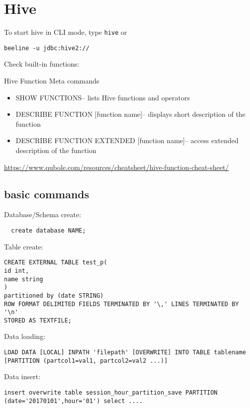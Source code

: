 \section{Hive}

To start hive in CLI mode, type \verb$hive$ or

\begin{verbatim}
beeline -u jdbc:hive2://
\end{verbatim}


Check built-in functions:

Hive Function Meta commands

\begin{itemize}
  \item 
SHOW FUNCTIONS– lists Hive functions and operators
  \item 
DESCRIBE FUNCTION [function name]– displays short description of the function
  \item 
DESCRIBE FUNCTION EXTENDED [function name]– access extended description of the function
\end{itemize}


\url{https://www.qubole.com/resources/cheatsheet/hive-function-cheat-sheet/}



\subsection{basic commands}

Database/Schema create:

\begin{verbatim}
  create database NAME;
\end{verbatim}

Table create:
\begin{verbatim}
CREATE EXTERNAL TABLE test_p(
id int,
name string 
)
partitioned by (date STRING)
ROW FORMAT DELIMITED FIELDS TERMINATED BY '\,' LINES TERMINATED BY '\n' 
STORED AS TEXTFILE;
\end{verbatim}


Data loading:

\begin{verbatim}
LOAD DATA [LOCAL] INPATH 'filepath' [OVERWRITE] INTO TABLE tablename [PARTITION (partcol1=val1, partcol2=val2 ...)]
\end{verbatim}


Data insert:
\begin{verbatim}
insert overwrite table session_hour_partition_save PARTITION (date='20170101',hour='01') select ....
\end{verbatim}


